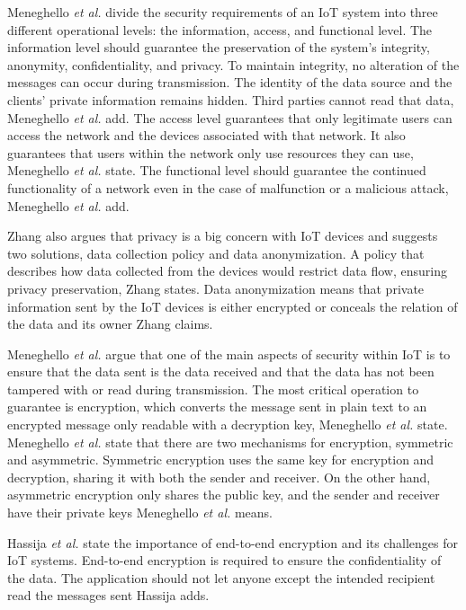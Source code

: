 Meneghello \textit{et al.} divide the security requirements of an IoT system into three different operational levels: the information, access, and functional level.
The information level should guarantee the preservation of the system's integrity, anonymity, confidentiality, and privacy\cite{Meneghello2019}.
To maintain integrity, no alteration of the messages can occur during transmission. The identity of the data source and the clients' private information remains hidden. 
Third parties cannot read that data, Meneghello \textit{et al.} add.
The access level guarantees that only legitimate users can access the network and the devices associated with that network. 
It also guarantees that users within the network only use resources they can use, Meneghello \textit{et al.} state.
The functional level should guarantee the continued functionality of a network even in the case of malfunction or a malicious attack, Meneghello \textit{et al.} add.

Zhang also argues that privacy is a big concern with IoT devices and suggests two solutions, data collection policy and data anonymization\cite{Zhang2014}.
A policy that describes how data collected from the devices would restrict data flow, ensuring privacy preservation, Zhang states.
Data anonymization means that private information sent by the IoT devices is either encrypted or conceals the relation of the data and its owner Zhang claims.

Meneghello \textit{et al.} argue that one of the main aspects of security within IoT is to ensure that the data sent is the data received and that the data has not been tampered with or read during transmission\cite{Meneghello2019}.
The most critical operation to guarantee is encryption, which converts the message sent in plain text to an encrypted message only readable with a decryption key, Meneghello \textit{et al.} state.
Meneghello \textit{et al.} state that there are two mechanisms for encryption, symmetric and asymmetric.
Symmetric encryption uses the same key for encryption and decryption, sharing it with both the sender and receiver.
On the other hand, asymmetric encryption only shares the public key, and the sender and receiver have their private keys Meneghello \textit{et al.} means.

Hassija \textit{et al.} state the importance of end-to-end encryption and its challenges for IoT systems\cite{Hassija2019}.
End-to-end encryption is required to ensure the confidentiality of the data. The application should not let anyone except the intended recipient read the messages sent Hassija adds.

